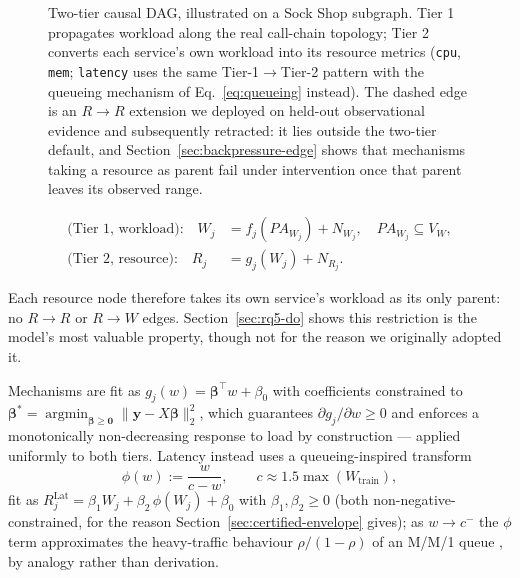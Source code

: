 \documentclass[journal, 10pt]{IEEEtran}
\begin{document}
\begin{figure}[t]
{%
}
\caption{Two-tier causal DAG, illustrated on a Sock Shop subgraph. Tier 1 propagates workload along the real call-chain topology; Tier 2 converts each service's own workload into its resource metrics (\texttt{cpu}, \texttt{mem}; \texttt{latency} uses the same Tier-1$\to$Tier-2 pattern with the queueing mechanism of Eq.~\eqref{eq:queueing} instead). The dashed edge is an $R\to R$ extension we deployed on held-out observational evidence and subsequently retracted: it lies outside the two-tier default, and Section~\ref{sec:backpressure-edge} shows that mechanisms taking a resource as parent fail under intervention once that parent leaves its observed range.}
\label{fig:dag}
\end{figure}

\begin{equation}
\begin{aligned}
\text{(Tier 1, workload):}\quad W_j &= f_j(PA_{W_j}) + N_{W_j}, \quad PA_{W_j} \subseteq V_W, \\
\text{(Tier 2, resource):}\quad R_j &= g_j(W_j) + N_{R_j}.
\end{aligned}
\label{eq:tiers}
\end{equation}

Each resource node therefore takes its own service's workload as its only parent:
no $R \to R$ or $R \to W$ edges. Section~\ref{sec:rq5-do} shows this restriction
is the model's most valuable property, though not for the reason we originally
adopted it.

Mechanisms are fit as $g_j(w) = \boldsymbol{\beta}^\top w + \beta_0$ with
coefficients constrained to
$\boldsymbol{\beta}^* = \operatorname*{argmin}_{\boldsymbol{\beta}\geq\mathbf{0}}
\lVert \mathbf{y} - X\boldsymbol{\beta}\rVert_2^2$, which guarantees
$\partial g_j/\partial w \geq 0$ and enforces a monotonically non-decreasing
response to load by construction --- applied uniformly to both tiers. Latency
instead uses a queueing-inspired transform
\begin{equation}
\phi(w) := \frac{w}{c-w}, \qquad c \approx 1.5 \max(W_{\text{train}}),
\label{eq:queueing}
\end{equation}
fit as $R^{\text{Lat}}_j = \beta_1 W_j + \beta_2\,\phi(W_j) + \beta_0$ with
$\beta_1,\beta_2\geq 0$ (both non-negative-constrained, for the reason
Section~\ref{sec:certified-envelope} gives); as $w \to c^-$ the $\phi$ term
approximates the heavy-traffic behaviour $\rho/(1-\rho)$ of an M/M/1 queue
\cite{kingman1961}, by analogy rather than derivation.
\end{document}
